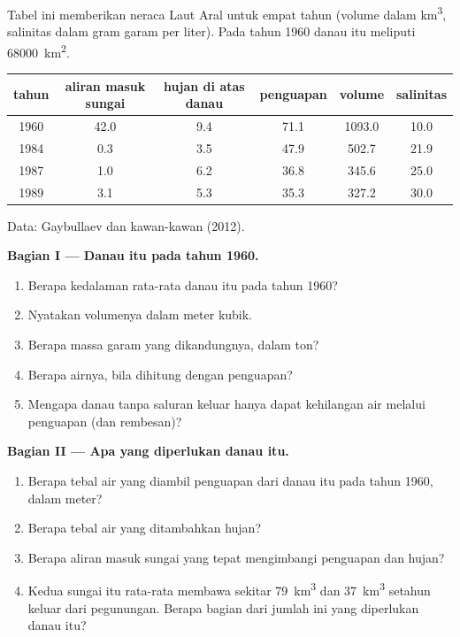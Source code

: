 \begin{problem}
\label{pb:g10:freshwater-resources:1}
Tabel ini memberikan neraca Laut Aral untuk empat tahun (volume dalam
\unit{km^3}, salinitas dalam gram garam per liter). Pada tahun 1960 danau itu
meliputi \qty{68000}{km^2}.
\begin{center}
\small
\begin{tabular}{|c|c|c|c|c|c|}
\hline
tahun & aliran masuk sungai & hujan di atas danau & penguapan & volume & salinitas \\ \hline
1960 & 42.0 & 9.4 & 71.1 & 1093.0 & 10.0 \\ \hline
1984 & 0.3 & 3.5 & 47.9 & 502.7 & 21.9 \\ \hline
1987 & 1.0 & 6.2 & 36.8 & 345.6 & 25.0 \\ \hline
1989 & 3.1 & 5.3 & 35.3 & 327.2 & 30.0 \\ \hline
\end{tabular}

{\small Data: Gaybullaev dan kawan-kawan (2012).}
\end{center}

\medskip
\noindent\textbf{Bagian I --- Danau itu pada tahun 1960.}
\begin{enumerate}
  \item Berapa kedalaman rata-rata danau itu pada tahun 1960?
  \item Nyatakan volumenya dalam meter kubik.
  \item Berapa massa garam yang dikandungnya, dalam ton?
  \item Berapa  airnya, bila dihitung dengan penguapan?
  \item Mengapa danau tanpa saluran keluar hanya dapat kehilangan air melalui
        penguapan (dan rembesan)?
\end{enumerate}

\medskip
\noindent\textbf{Bagian II --- Apa yang diperlukan danau itu.}
\begin{enumerate}[resume]
  \item Berapa tebal air yang diambil penguapan dari danau itu pada tahun
        1960, dalam meter?
  \item Berapa tebal air yang ditambahkan hujan?
  \item Berapa aliran masuk sungai yang tepat mengimbangi penguapan dan
        hujan?
  \item Kedua sungai itu rata-rata membawa sekitar \qty{79}{km^3} dan
        \qty{37}{km^3} setahun keluar dari pegunungan. Berapa bagian dari
        jumlah ini yang diperlukan danau itu?
\end{enumerate}


\end{problem}
